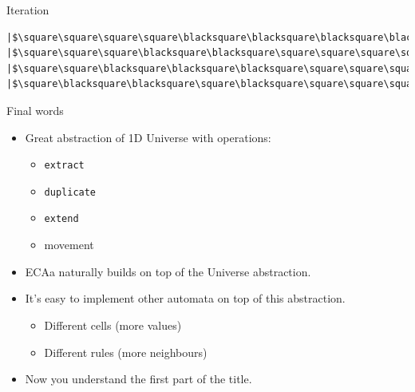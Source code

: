 \documentclass[presentation,aspectratio=169,smaller]{beamer}
\begin{document}
\begin{frame}[label={sec:org966a2db},fragile]{Iteration}
\begin{verbatim}
|$\square\square\square\square\blacksquare\blacksquare\blacksquare\blacksquare\blacksquare\blacksquare\blacksquare\blacksquare\square\blacksquare\blacksquare\square\square\square\blacksquare\blacksquare\blacksquare\square\square\square\square\square\square\square\square\square\square\square\square\square\square\square\square\square\square\square\square$|
|$\square\square\square\blacksquare\blacksquare\square\square\square\square\square\square\blacksquare\blacksquare\blacksquare\blacksquare\square\square\blacksquare\blacksquare\square\blacksquare\square\square\square\square\square\square\square\square\square\square\square\square\square\square\square\square\square\square\square\square$|
|$\square\square\blacksquare\blacksquare\blacksquare\square\square\square\square\square\blacksquare\blacksquare\square\square\blacksquare\square\blacksquare\blacksquare\blacksquare\blacksquare\blacksquare\square\square\square\square\square\square\square\square\square\square\square\square\square\square\square\square\square\square\square\square$|
|$\square\blacksquare\blacksquare\square\blacksquare\square\square\square\square\blacksquare\blacksquare\blacksquare\square\blacksquare\blacksquare\blacksquare\blacksquare\square\square\square\blacksquare\square\square\square\square\square\square\square\square\square\square\square\square\square\square\square\square\square\square\square\square$|
\end{verbatim}
\end{frame}

\begin{frame}[label={sec:orge4cbd1b},fragile]{Final words}
 \begin{itemize}
\item <1-> Great abstraction of 1D Universe with operations:
\begin{itemize}
\item \texttt{extract}
\item \texttt{duplicate}
\item \texttt{extend}
\item movement
\end{itemize}
\item <2-> ECAa naturally builds on top of the Universe abstraction.
\item <3-> It's easy to implement other automata on top of this abstraction.
\begin{itemize}
\item Different cells (more values)
\item Different rules (more neighbours)
\end{itemize}
\item <4-> Now you understand the first part of the title.
\end{itemize}
\end{frame}
\end{document}
